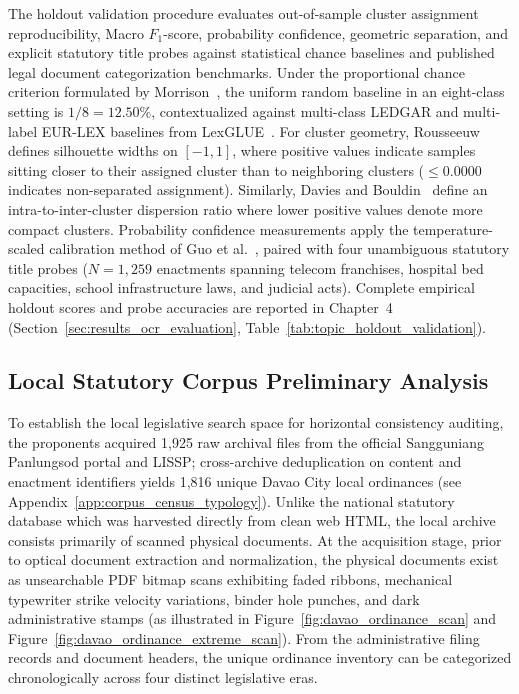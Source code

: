         The holdout validation procedure evaluates out-of-sample cluster assignment reproducibility, Macro $F_1$-score, probability confidence, geometric separation, and explicit statutory title probes against statistical chance baselines and published legal document categorization benchmarks. Under the proportional chance criterion formulated by Morrison~\cite{morrison1969interpretation}, the uniform random baseline in an eight-class setting is $1/8 = 12.50\%$, contextualized against multi-class LEDGAR and multi-label EUR-LEX baselines from LexGLUE~\cite{chalkidis2022lexglue}. For cluster geometry, Rousseeuw~\cite{rousseeuw1987silhouettes} defines silhouette widths on $[-1, 1]$, where positive values indicate samples sitting closer to their assigned cluster than to neighboring clusters ($\le 0.0000$ indicates non-separated assignment). Similarly, Davies and Bouldin~\cite{davies1979cluster} define an intra-to-inter-cluster dispersion ratio where lower positive values denote more compact clusters. Probability confidence measurements apply the temperature-scaled calibration method of Guo et al.~\cite{guo2017calibration}, paired with four unambiguous statutory title probes ($N = 1,259$ enactments spanning telecom franchises, hospital bed capacities, school infrastructure laws, and judicial acts). Complete empirical holdout scores and probe accuracies are reported in Chapter~4 (Section~\ref{sec:results_ocr_evaluation}, Table~\ref{tab:topic_holdout_validation}).
        \subsection{Local Statutory Corpus Preliminary Analysis}
        \label{sec:municipal_corpus_inventory}
        To establish the local legislative search space for horizontal consistency auditing, the proponents acquired 1,925 raw archival files from the official Sangguniang Panlungsod portal and LISSP; cross-archive deduplication on content and enactment identifiers yields 1,816 unique Davao City local ordinances (see Appendix~\ref{app:corpus_census_typology}). Unlike the national statutory database which was harvested directly from clean web HTML, the local archive consists primarily of scanned physical documents. At the acquisition stage, prior to optical document extraction and normalization, the physical documents exist as unsearchable PDF bitmap scans exhibiting faded ribbons, mechanical typewriter strike velocity variations, binder hole punches, and dark administrative stamps (as illustrated in Figure~\ref{fig:davao_ordinance_scan} and Figure~\ref{fig:davao_ordinance_extreme_scan}). From the administrative filing records and document headers, the unique ordinance inventory can be categorized chronologically across four distinct legislative eras.

